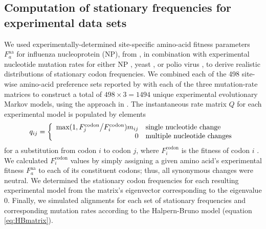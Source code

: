 \documentclass[11pt]{article}
\begin{document}
\subsection*{Computation of stationary frequencies for experimental data sets}
We used experimentally-determined site-specific amino-acid fitness parameters $F^\text{aa}_a$ for influenza nucleoprotein (NP), from \citet{Bloom2014a}, in combination with experimental nucleotide mutation rates for either NP \citep{Bloom2014a}, yeast \citep{Zhu2014}, or polio virus \citep{Acevedo2014}, to derive realistic distributions of stationary codon frequencies. We combined each of the  498 site-wise amino-acid preference sets reported by \citet{Bloom2014a} with each of the three mutation-rate matrices to construct a total of $498 \times 3 = 1494$ unique experimental evolutionary Markov models, using the approach in \citet{Bloom2014a,Bloom2014b}. The instantaneous rate matrix $Q$ for each experimental model is populated by elements
\begin{equation}
q_{ij} =  \left\{ 
\begin{array}{rl}
  \text{max}(1, F^\text{codon}_j \big{/} F^\text{codon}_i)m_{ij} & \text{single nucleotide change} \\
  0                                                & \text{multiple nucleotide changes}  \\
\end{array} \right.
\end{equation} for a substitution from codon $i$ to codon $j$, where $F^\text{codon}_i$ is the fitness of codon $i$ \citep{Bloom2014a,Bloom2014b}. We calculated $F^\text{codon}_i$ values by simply assigning a given amino acid's experimental fitness $F^\text{aa}_a$ to each of its constituent codons; thus, all synonymous changes were neutral. We determined the stationary codon frequencies for each resulting experimental model from the matrix's eigenvector corresponding to the eigenvalue 0. Finally, we simulated alignments for each set of stationary frequencies and corresponding mutation rates according to the Halpern-Bruno model (equation \eqref{eq:HBmatrix}).   

		
\end{document}
